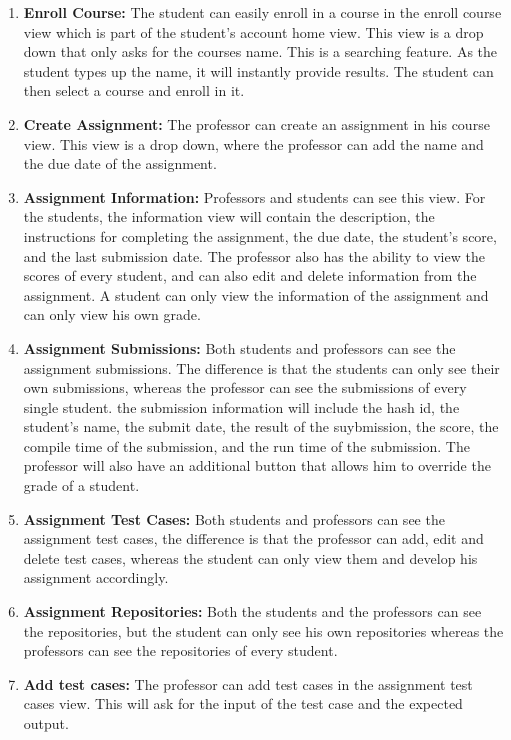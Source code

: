 \begin{enumerate}
\item \textbf{Enroll Course:} The student can easily enroll in a course in the
enroll course view which is part of the student's account home view. This view
is a drop down that only asks for the courses name. This is a searching
feature. As the student types up the name, it will instantly provide results.
The student can then select a course and enroll in it.

\item \textbf{Create Assignment:} The professor can create an assignment in his
course view. This view is a drop down, where the professor can add the
name and the due date of the assignment.

\item \textbf{Assignment Information:} Professors and students can see this
view. For the students, the information view will contain the description, the
instructions for completing the assignment, the due date, the student's score,
and the last submission date. The professor also has the ability to view the
scores of every student, and can also edit and delete information from the
assignment. A student can only view the information of the assignment and can
only view his own grade.

\item \textbf{Assignment Submissions:} Both students and professors can see the
assignment submissions. The difference is that the students can only see their
own submissions, whereas the professor can see the submissions of every single
student. the submission information will include the hash id, the student's
name, the submit date, the result of the suybmission, the score, the compile
time of the submission, and the run time of the submission. The professor will
also have an additional button that allows him to override the grade of a
student.

\item \textbf{Assignment Test Cases:} Both students and professors can see the
assignment test cases, the difference is that the professor can add, edit and
delete test cases, whereas the student can only view them and develop his
assignment accordingly.

\item \textbf{Assignment Repositories:} Both the students and the professors
can see the repositories, but the student can only see his own repositories
whereas the professors can see the repositories of every student.

\item \textbf{Add test cases:} The professor can add test cases in the
assignment test cases view. This will ask for the input of the test case and
the expected output.


\end{enumerate}

